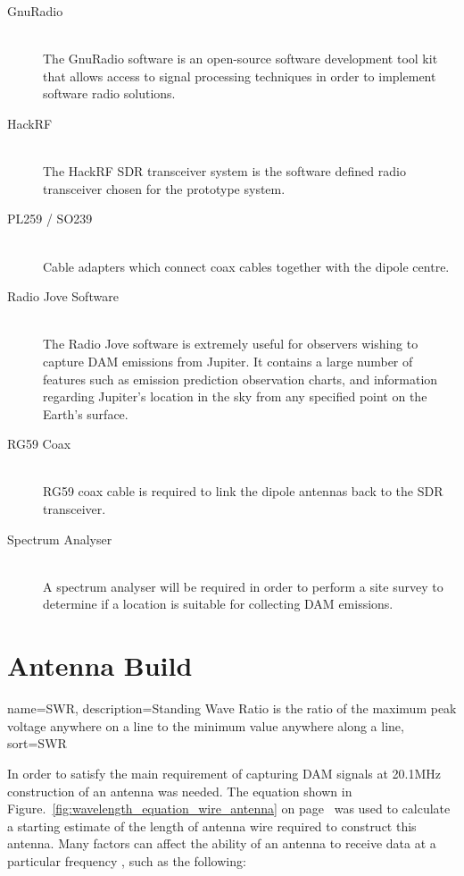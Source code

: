 \begin{description}
  \item[GnuRadio] \hfill \\
  The GnuRadio software is an open-source software development tool kit that allows access to signal processing techniques in order to implement software radio solutions.
  \item[HackRF] \hfill \\
  The HackRF \gls{SDR} transceiver system is the software defined radio transceiver chosen for the prototype system.
  \item[PL259 / SO239] \hfill \\
  Cable adapters which connect coax cables together with the dipole centre.
  \item[Radio Jove Software] \hfill \\
  The Radio Jove software is extremely useful for observers wishing to capture \gls{DAM} emissions from Jupiter. It contains a large number of features such as emission prediction observation charts, and information regarding Jupiter's location in the sky from any specified point on the Earth's surface.
  \item[RG59 Coax] \hfill \\
  RG59 coax cable is required to link the dipole antennas back to the \gls{SDR} transceiver.
  \item[Spectrum Analyser] \hfill \\
  A spectrum analyser will be required in order to perform a site survey to determine if a location is suitable for collecting \gls{DAM} emissions.
\end{description}


\section*{Antenna Build}

{
  name={SWR},
  description={Standing Wave Ratio is the ratio of the maximum peak voltage
  	anywhere on a line to the minimum value anywhere along a line},
  sort=SWR
}

In order to satisfy the main requirement of capturing \gls{DAM} signals at 20.1MHz construction of an antenna was needed. The equation shown in Figure.~\ref{fig:wavelength_equation_wire_antenna} on page~\pageref{fig:wavelength_equation_wire_antenna} was used to calculate a starting estimate of the length of antenna wire required to construct this antenna. Many factors can affect the ability of an antenna to receive data at a particular frequency \citep{arrl-00}, such as the following:

